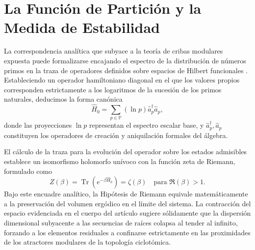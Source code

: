\documentclass{article}
\numberwithin{equation}{section}
\theoremstyle{plain}
\theoremstyle{definition}
\begin{document}
\section{La Función de Partición y la Medida de Estabilidad}
\label{apendice:hamiltoniano_primones}

La correspondencia analítica que subyace a la teoría de cribas modulares expuesta puede formalizarse encajando el espectro de la distribución de números primos en la traza de operadores definidos sobre espacios de Hilbert funcionales \cite{Julia1990}. Estableciendo un operador hamiltoniano diagonal en el que los valores propios corresponden estrictamente a los logaritmos de la sucesión de los primos naturales, deducimos la forma canónica
\begin{equation}
    \hat{H}_0 = \sum_{p \in \mathbb{P}} (\ln p) \hat{a}_p^\dagger \hat{a}_p,
\end{equation}
donde las proyecciones $\ln p$ representan el espectro escalar base, y $\hat{a}_p^\dagger, \hat{a}_p$ constituyen los operadores de creación y aniquilación formales del álgebra.

El cálculo de la traza para la evolución del operador sobre los estados admisibles establece un isomorfismo holomorfo unívoco con la función zeta de Riemann, formulado como
\begin{equation}
    Z(\beta) = \operatorname{Tr}(e^{-\beta \hat{H}_0}) = \zeta(\beta) \quad \text{para } \Re(\beta) > 1.
\end{equation}
Bajo este encuadre analítico, la Hipótesis de Riemann equivale matemáticamente a la preservación del volumen ergódico en el límite del sistema. La contracción del espacio evidenciada en el cuerpo del artículo sugiere sólidamente que la dispersión dimensional subyacente a las secuencias de raíces colapsa al tender al infinito, forzando a los elementos residuales a confinarse estrictamente en las proximidades de los atractores modulares de la topología ciclotómica.
\end{document}
